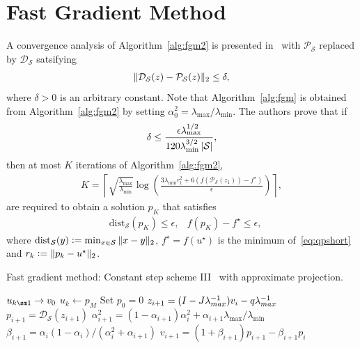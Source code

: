 \documentclass[hidelinks]{article}
\begin{document}
\section{Fast Gradient Method}
A convergence analysis of Algorithm~\ref{alg:fgm2} is presented in~\cite{FGMPROJECTION} with $\mathcal{P}_{\mathcal{S}}$ replaced by $\mathcal{D}_{\mathcal{S}}$ satsifying
\begin{align}
\Vert \mathcal{D}_{\mathcal{S}}(z) - \mathcal{P}_{\mathcal{S}}(z) \Vert_2 \leq \delta,
\end{align}
where $\delta>0$ is an arbitrary constant. Note that Algorithm~\ref{alg:fgm} is obtained from Algorithm~\ref{alg:fgm2} by setting $\alpha_0^2=\lambda_\text{max}/\lambda_\text{min}$. The authors prove that if
\begin{align}
\delta \leq \frac{\epsilon\lambda_\text{max}^{1/2}}{120\lambda_\text{min}^{3/2}\left\lvert \mathcal{S} \right\rvert},
\end{align}
then at most $K$ iterations of Algorithm~\ref{alg:fgm2},
\begin{align}
K=\left\lceil\sqrt{\frac{\lambda_\text{max}}{\lambda_\text{min}}}\log\left(
\frac{3\lambda_\text{min}r_1^2+6(f(\mathcal{P}_\mathcal{S}(z_1))-f^\star)}{\epsilon}
\right)\right\rceil,
\end{align}
are required to obtain a solution $p_K$ that satisfies
\begin{align}
&\text{dist}_\mathcal{S}(p_K)\leq\epsilon,& f(p_K)-f^\star\leq\epsilon,
\end{align}
where $\text{dist}_\mathcal{S}(y)\vcentcolon=\min_{x\in\mathcal{S}}\Vert x-y \Vert_2$, $f^\star=f(u^\star)$ is the minimum of~\eqref{eq:qpshort} and $r_k\vcentcolon=\Vert p_k-u^\star \Vert_2$.
%
\begin{algorithm}[H]
 \caption{Fast gradient method: Constant step scheme III~\cite[Ch. 2.2.4]{OPTIMNESTEROV} with approximate projection.} \label{alg:fgm2}
 \begin{algorithmic}[1]
    \REQUIRE ${u}_{k\sm 1}\rightarrow v_0$
    \ENSURE ${u}_k\leftarrow p_M$
    \STATE Set $p_0=0$
  	  \STATE ${z}_{i+1} = (I - {J}\lambda^{-1}_{max}){v}_i - {q} \lambda^{-1}_{max}$
  	  \STATE ${p}_{i+1} = \mathcal{D}_{\mathcal{S}}({z}_{i+1})$
  	  \STATE $\alpha_{i+1}^2=(1-\alpha_{i+1})\alpha_i^2+\alpha_{i+1}\lambda_\text{max}/\lambda_\text{min}$
  	  \STATE $\beta_{i+1}=\alpha_i(1-\alpha_i)/(\alpha_i^2+\alpha_{i+1})$
  	  \STATE ${v}_{i+1} = (1+\beta_{i+1}){p}_{i+1} - \beta_{i+1} {p}_i$
	\ENDFOR
 \end{algorithmic}
\end{algorithm}
%
\end{document}
